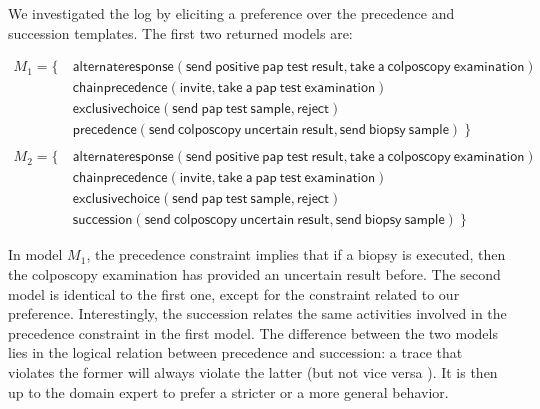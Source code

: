 We investigated the log by eliciting a preference over the \textsf{precedence} and \textsf{succession} templates. The first two returned models are:

\begin{align*}
M_1 = \{ \ &  \mathsf{ alternateresponse(send\ positive\ pap\ test\ result, take\ a\ colposcopy\ examination)} \\
& \mathsf{ chainprecedence(invite, take\ a\ pap\ test\ examination)} \\
& \mathsf{ exclusivechoice(send\ pap\ test\ sample, reject)} \\
& \mathsf{precedence(send\ colposcopy\ uncertain\ result, send\ biopsy\ sample)} \ \}  \\ \\
M_2 = \{ \ &  \mathsf{ alternateresponse(send\ positive\ pap\ test\ result, take\ a\ colposcopy\ examination)} \\
& \mathsf{ chainprecedence(invite, take\ a\ pap\ test\ examination)} \\
& \mathsf{ exclusivechoice(send\ pap\ test\ sample, reject)} \\
& \mathsf{succession(send\ colposcopy\ uncertain\ result, send\ biopsy\ sample)} \ \}  
\end{align*}

In model $M_1$, the \textsf{precedence} constraint implies that if a biopsy is executed, then the colposcopy examination has provided an uncertain result before. The second model is identical to the first one, except for the constraint related %
to our preference. Interestingly, the \textsf{succession} relates %
the same activities involved in %
the \textsf{precedence} constraint in the first model. The difference between the two models lies in the logical relation between \textsf{precedence} and \textsf{succession}: a trace that violates the former will always violate the latter (but not vice versa%
). It is then up to the domain expert to prefer a stricter or a more general behavior.


